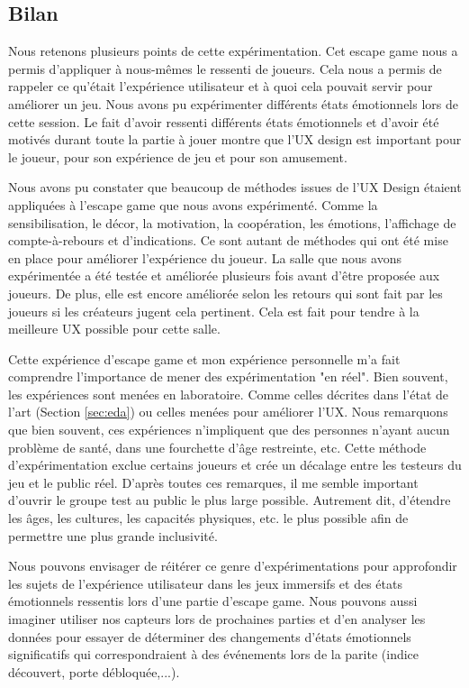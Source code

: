 \documentclass[11pt]{article}
\begin{document}
	\subsection{Bilan}\label{sec:escapebilan}
		Nous retenons plusieurs points de cette expérimentation.
		Cet escape game nous a permis d'appliquer à nous-mêmes le ressenti de joueurs.
		Cela nous a permis de rappeler ce qu'était l'expérience utilisateur et à quoi cela pouvait servir pour améliorer un jeu.
		Nous avons pu expérimenter différents états émotionnels lors de cette session.
		Le fait d'avoir ressenti différents états émotionnels et d'avoir été motivés durant toute la partie à jouer montre que l'UX design est important pour le joueur, pour son expérience de jeu et pour son amusement.\par
		Nous avons pu constater que beaucoup de méthodes issues de l'UX Design étaient appliquées à l'escape game que nous avons expérimenté.
		Comme la sensibilisation, le décor, la motivation, la coopération, les émotions, l'affichage de compte-à-rebours et d'indications.
		Ce sont autant de méthodes qui ont été mise en place pour améliorer l'expérience du joueur.
		La salle que nous avons expérimentée a été testée et améliorée plusieurs fois avant d'être proposée aux joueurs.
		De plus, elle est encore améliorée selon les retours qui sont fait par les joueurs si les créateurs jugent cela pertinent.
		Cela est fait pour tendre à la meilleure UX possible pour cette salle.\par
		Cette expérience d'escape game et mon expérience personnelle m'a fait comprendre l'importance de mener des expérimentation "en réel".
		Bien souvent, les expériences sont menées en laboratoire.
		Comme celles décrites dans l'état de l'art (Section \ref{sec:eda}) ou celles menées pour améliorer l'UX.
		Nous remarquons que bien souvent, ces expériences n'impliquent que des personnes n'ayant aucun problème de santé, dans une fourchette d'âge restreinte, etc.
		Cette méthode d'expérimentation exclue certains joueurs et crée un décalage entre les testeurs du jeu et le public réel.
		D'après toutes ces remarques, il me semble important d'ouvrir le groupe test au public le plus large possible.
		Autrement dit, d'étendre les âges, les cultures, les capacités physiques, etc. le plus possible afin de permettre une plus grande inclusivité.\par
		Nous pouvons envisager de réitérer ce genre d'expérimentations pour approfondir les sujets de l'expérience utilisateur dans les jeux immersifs et des états émotionnels ressentis lors d'une partie d'escape game.
		Nous pouvons aussi imaginer utiliser nos capteurs lors de prochaines parties et d'en analyser les données pour essayer de déterminer des changements d'états émotionnels significatifs qui correspondraient à des événements lors de la parite (indice découvert, porte débloquée,...).
\end{document}

